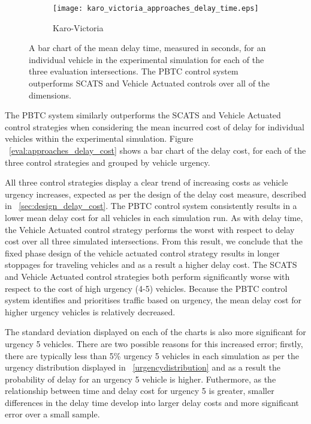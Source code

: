 {\begin{figure}
\vspace{1cm}

\begin{subfigure}{.5\textwidth}
  \centering
  \texttt{[image: karo\_victoria\_approaches\_delay\_time.eps]}
  \caption{Karo-Victoria}
  \label{approaches_delay_time:sub3}
\end{subfigure}%
\caption{ A bar chart of the mean delay time, measured in seconds, for an individual vehicle in the experimental simulation for each of the three evaluation intersections. The PBTC control system outperforms SCATS and Vehicle Actuated controls over all of the dimensions.  }
\label{eval:approaches_delay_time}
\end{figure}

The PBTC system similarly outperforms the SCATS and Vehicle Actuated control strategies when considering the mean incurred cost of delay for individual vehicles within the experimental simulation. Figure ~\ref{eval:approaches_delay_cost} shows a bar chart of the delay cost, for each of the three control strategies and grouped by vehicle urgency. 

All three control strategies display a clear trend of increasing costs as vehicle urgency increases, expected as per the design of the delay cost measure, described in ~\ref{sec:design_delay_cost}. The PBTC control system consistently results in a lower mean delay cost for all vehicles in each simulation run. As with delay time, the Vehicle Actuated control strategy performs the worst with respect to delay cost over all three simulated intersections. From this result, we conclude that the fixed phase design of the vehicle actuated control strategy results in longer stoppages for traveling vehicles and as a result a higher delay cost. The SCATS and Vehicle Actuated control strategies both perform significantly worse with respect to the cost of high urgency (4-5) vehicles. Because the PBTC control system identifies and prioritises traffic based on urgency, the mean delay cost for higher urgency vehicles is relatively decreased.

 The standard deviation displayed on each of the charts is also more significant for urgency 5 vehicles. There are two possible reasons for this increased error; firstly, there are typically less than 5\% urgency 5 vehicles in each simulation as per the urgency distribution displayed in ~\ref{urgencydistribution} and as a result the probability of delay for an urgency 5 vehicle is higher. Futhermore, as the relationship between time and delay cost for urgency 5 is greater, smaller differences in the delay time develop into larger delay costs and more significant error over a small sample.
 
}
